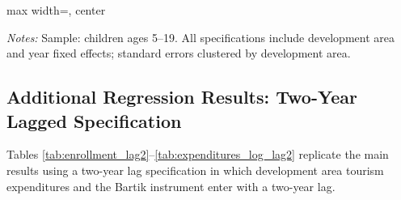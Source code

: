 \documentclass[12pt]{article}
\newcommand*{\TableContempPath}{../Paper_3_Tables/Main_Regression_Tables}
\begin{document}
	\begin{table}[H]
	\centering
	\begin{adjustbox}{max width=\linewidth, center}
	\begin{threeparttable}
		\caption{Skills Program Enrollment and Completion, IV Estimates (Contemporaneous)}
		\label{tab:skills_contemp}
		{\small}
		\begin{tablenotes}
			\small
			\item \textit{Notes:} Sample: children ages 5--19. All specifications include development area and year fixed effects; standard errors clustered by development area.
		\end{tablenotes}
	\end{threeparttable}
	\end{adjustbox}
	\end{table}

	\FloatBarrier

	\subsection{Additional Regression Results: Two-Year Lagged Specification}
	\label{subsec:app_lag2}

	Tables \ref{tab:enrollment_lag2}--\ref{tab:expenditures_log_lag2} replicate the main results using a two-year lag specification in which development area tourism expenditures and the Bartik instrument enter with a two-year lag.
\end{document}
